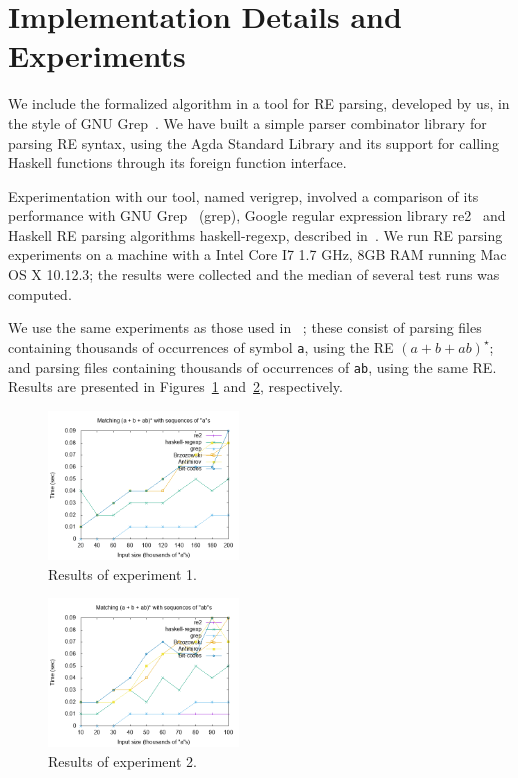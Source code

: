 \documentclass[sigplan, anonymous, review]{acmart}
\theoremstyle{definition}
\begin{document}
\section{Implementation Details and Experiments}\label{sec:exp}

We include the formalized algorithm in a tool for RE parsing, developed by us, in the
style of GNU Grep~\cite{Grep}. We have built a simple parser
combinator library for parsing RE syntax, using the Agda Standard
Library and its support for calling Haskell functions through its
foreign function interface.

Experimentation with our tool, named verigrep, involved a comparison
of its performance with GNU Grep~\cite{Grep} (grep), Google regular
expression library re2~\cite{re2} and Haskell RE parsing algorithms
haskell-regexp, described in~\cite{Fischer2010}. We run RE parsing
experiments on a machine with a Intel Core I7 1.7 GHz, 8GB RAM running
Mac OS X 10.12.3; the results were collected and the median of several
test runs was computed.

We use the same experiments as those used in ~\cite{SulzmannL14};
these consist of parsing files containing thousands of occurrences of
symbol \texttt{a}, using the RE $(a + b + ab)^\star$; and parsing
files containing thousands of occurrences of \texttt{ab}, using the
same RE. Results are presented in Figures~\ref{fig:graph1}
and~\ref{fig:graph2}, respectively.

\begin{figure}[!ht]
    \includegraphics[width=0.45\textwidth]{as.png}
   \centering
   \caption{Results of experiment 1.}
   \label{fig:graph1}
\end{figure}

\begin{figure}[!ht]
    \includegraphics[width=0.45\textwidth]{abs.png}
   \centering
   \caption{Results of experiment 2.}
   \label{fig:graph2}
\end{figure}
\end{document}

